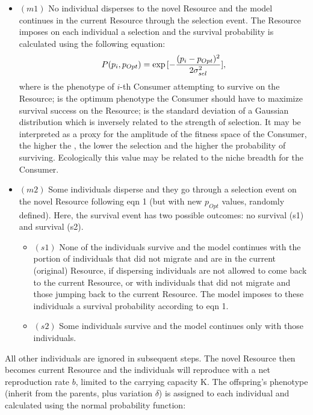 \begin{itemize}
 \item $(m1)$ No individual disperses to the novel Resource and the model continues in the current Resource through the selection event.
The Resource imposes on each individual a selection and the survival probability is calculated using the following equation:
\begin{gather}
 P (\emph{$p_{i}$},\emph{$p_{Opt}$}) = \exp{[- \frac{(\emph{$p_{i}$}-\emph{$p_{Opt}$})^2}{2\sigma_{sel}^2}]} ,
\end{gather}
where  is the phenotype of $i$-th Consumer attempting to survive on the Resource;  is the optimum phenotype the Consumer should have to maximize survival success on the Resource;  is the standard deviation of a Gaussian distribution which is inversely related to the strength of selection. It may be interpreted as a proxy for the amplitude of the fitness space of the Consumer, the higher the , the lower the selection and the higher the probability of surviving. Ecologically this value may be related to the niche breadth for the Consumer.

\item $(m2)$ Some individuals disperse and they go through a selection event on the novel Resource following eqn 1 (but with new $p_{Opt}$ values, randomly defined). Here, the survival event has two possible outcomes: no survival (s1) and survival (s2).
\begin{itemize}
\item $(s1)$ None of the individuals survive and the model continues with the portion of individuals that did not migrate and are in the current (original) Resource, if dispersing individuals are not allowed to come back to the current Resource, or with individuals that did not migrate and those jumping back to the current Resource. The model imposes to these individuals a survival probability according to eqn 1.
\item $(s2)$ Some individuals survive and the model continues only with those individuals.
\end{itemize}
\end{itemize}
All other individuals are ignored in subsequent steps. The novel Resource then becomes current Resource and the individuals will reproduce with a net reproduction rate $b$, limited to the carrying capacity K. The offspring's phenotype (inherit from the parents, plus variation $\delta$) is assigned to each individual and calculated using the normal probability function:
